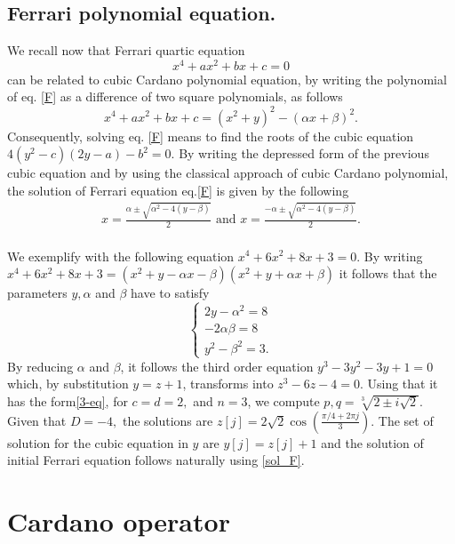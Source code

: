 \documentclass[11pt,reqno]{amsart}
\begin{document}
\subsection{Ferrari polynomial equation.}\label{Ferrai-eq}
We recall now that  Ferrari quartic equation\cite{Fujii2013}  
\begin{equation} \label{F}
    x^4+ ax^2+bx+c=0
\end{equation}
can be related to cubic Cardano polynomial equation, by writing the polynomial of eq. \eqref{F} as a difference of two square polynomials, as follows
\begin{equation}\nonumber
x^4+ ax^2+bx+c=(x^2+y)^2-(\alpha x+\beta)^2.
\end{equation}Consequently, solving eq. \eqref{F} means to find the roots of the cubic equation  $4(y^2-c)(2y-a)-b^2=0.$ By writing the depressed form of the previous cubic equation and by using the classical approach of cubic Cardano polynomial, the solution of Ferrari equation eq.\eqref{F} is given by the following 
\begin{eqnarray}\label{sol_F}
    x=\frac{\alpha\pm \sqrt{\alpha^2-4(y-\beta)}}{2} \text{ and } x=\frac{-\alpha\pm \sqrt{\alpha^2-4(y-\beta)}}{2}.
\end{eqnarray}\\
We exemplify with the following equation $x^4+6x^2+8x+3=0.$
By writing $x^4+6x^2+8x+3=(x^2+y-\alpha x-\beta)(x^2+y+\alpha x+\beta)$ 
it follows that the parameters $y, \alpha$ and $\beta $ have to satisfy
\begin{equation}
    \begin{cases}
       2y-\alpha^2=8\\-2\alpha\beta=8\\y^2-\beta^2=3. 
    \end{cases}
\end{equation}
By reducing $\alpha$ and $\beta$, it follows the third order equation $y^3-3y^2-3y+1=0$ which, by substitution $y=z+1$, transforms into $z^3-6z-4=0.$ Using that it has the form\eqref{3-eq}, for $c=d=2,$ and $n=3$, we compute $p,q=\sqrt[3]{2\pm i\sqrt{2}}.$ Given that $D=-4,$ the solutions are $z[j]=2\sqrt{2}\cos(\frac{\pi/4+2\pi j}{3})$. The set of solution for the cubic equation in $y$ are $y[j]=z[j]+1$  and the solution of initial Ferrari equation follows naturally using \eqref{sol_F}.
\vspace{0.3cm}
\section{Cardano operator}\label{S:Op}
\end{document}
